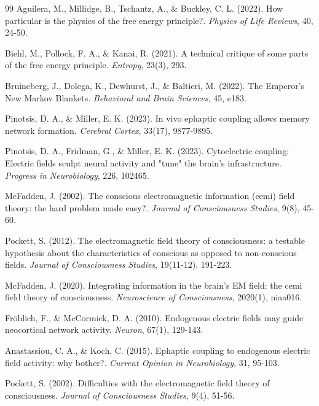 \begin{thebibliography}{99}
 Aguilera, M., Millidge, B., Tschantz, A., \& Buckley, C. L. (2022). How particular is the physics of the free energy principle?. \textit{Physics of Life Reviews}, 40, 24-50.

 Biehl, M., Pollock, F. A., \& Kanai, R. (2021). A technical critique of some parts of the free energy principle. \textit{Entropy}, 23(3), 293.

 Bruineberg, J., Dolega, K., Dewhurst, J., \& Baltieri, M. (2022). The Emperor's New Markov Blankets. \textit{Behavioral and Brain Sciences}, 45, e183.

 Pinotsis, D. A., \& Miller, E. K. (2023). In vivo ephaptic coupling allows memory network formation. \textit{Cerebral Cortex}, 33(17), 9877-9895.

 Pinotsis, D. A., Fridman, G., \& Miller, E. K. (2023). Cytoelectric coupling: Electric fields sculpt neural activity and "tune" the brain's infrastructure. \textit{Progress in Neurobiology}, 226, 102465.

 McFadden, J. (2002). The conscious electromagnetic information (cemi) field theory: the hard problem made easy?. \textit{Journal of Consciousness Studies}, 9(8), 45-60.

 Pockett, S. (2012). The electromagnetic field theory of consciousness: a testable hypothesis about the characteristics of conscious as opposed to non-conscious fields. \textit{Journal of Consciousness Studies}, 19(11-12), 191-223.

 McFadden, J. (2020). Integrating information in the brain's EM field: the cemi field theory of consciousness. \textit{Neuroscience of Consciousness}, 2020(1), niaa016.

 Fr\"{o}hlich, F., \& McCormick, D. A. (2010). Endogenous electric fields may guide neocortical network activity. \textit{Neuron}, 67(1), 129-143.

 Anastassiou, C. A., \& Koch, C. (2015). Ephaptic coupling to endogenous electric field activity: why bother?. \textit{Current Opinion in Neurobiology}, 31, 95-103.

 Pockett, S. (2002). Difficulties with the electromagnetic field theory of consciousness. \textit{Journal of Consciousness Studies}, 9(4), 51-56.


\end{thebibliography}
